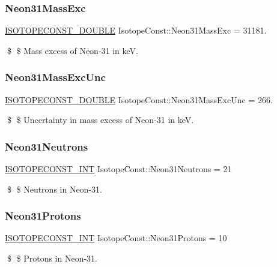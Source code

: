 \subsubsection{\texorpdfstring{Neon31\+Mass\+Exc}{Neon31MassExc}}
{\footnotesize\ttfamily \mbox{\hyperlink{group___isotope_const-_macros_ga8f45a7272ce02c0b4c65c44636ed719a}{I\+S\+O\+T\+O\+P\+E\+C\+O\+N\+S\+T\+\_\+\+D\+O\+U\+B\+LE}} Isotope\+Const\+::\+Neon31\+Mass\+Exc = 31181.}

\$ \$ Mass excess of Neon-\/31 in keV. \mbox{\label{group___isotope_const-_neon-_ne31_ga978e7a5085d09d81b863b4d2e28e8fc2}} 
\subsubsection{\texorpdfstring{Neon31\+Mass\+Exc\+Unc}{Neon31MassExcUnc}}
{\footnotesize\ttfamily \mbox{\hyperlink{group___isotope_const-_macros_ga8f45a7272ce02c0b4c65c44636ed719a}{I\+S\+O\+T\+O\+P\+E\+C\+O\+N\+S\+T\+\_\+\+D\+O\+U\+B\+LE}} Isotope\+Const\+::\+Neon31\+Mass\+Exc\+Unc = 266.}

\$ \$ Uncertainty in mass excess of Neon-\/31 in keV. \mbox{\label{group___isotope_const-_neon-_ne31_ga8fa71fa9f750f4639e79b77c4a361f45}} 
\subsubsection{\texorpdfstring{Neon31\+Neutrons}{Neon31Neutrons}}
{\footnotesize\ttfamily \mbox{\hyperlink{group___isotope_const-_macros_ga5f18360b3e99483a35c32d789e62621c}{I\+S\+O\+T\+O\+P\+E\+C\+O\+N\+S\+T\+\_\+\+I\+NT}} Isotope\+Const\+::\+Neon31\+Neutrons = 21}

\$ \$ Neutrons in Neon-\/31. \mbox{\label{group___isotope_const-_neon-_ne31_gafbb83772cbd143a983e6f46540f95d50}} 
\subsubsection{\texorpdfstring{Neon31\+Protons}{Neon31Protons}}
{\footnotesize\ttfamily \mbox{\hyperlink{group___isotope_const-_macros_ga5f18360b3e99483a35c32d789e62621c}{I\+S\+O\+T\+O\+P\+E\+C\+O\+N\+S\+T\+\_\+\+I\+NT}} Isotope\+Const\+::\+Neon31\+Protons = 10}

\$ \$ Protons in Neon-\/31. 